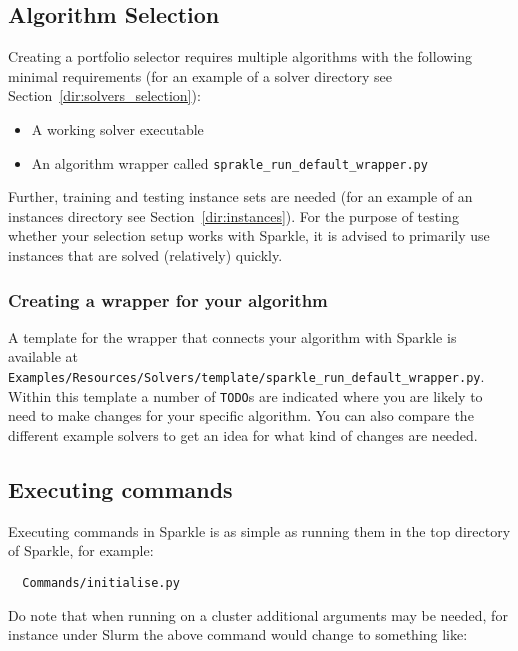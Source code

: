 \documentclass{article}
\begin{document}
\subsection{Algorithm Selection}
\label{quick:select_environment}

Creating a portfolio selector requires multiple algorithms with the following minimal requirements (for an example of a solver directory see Section~\ref{dir:solvers_selection}):

\begin{itemize}
  \item A working solver executable
  \item[\ref{quick:select_wrapper}] An algorithm wrapper called \texttt{sprakle\_run\_default\_wrapper.py}
\end{itemize}

Further, training and testing instance sets are needed (for an example of an instances directory see Section~\ref{dir:instances}). For the purpose of testing whether your selection setup works with Sparkle, it is advised to primarily use instances that are solved (relatively) quickly.

\subsubsection{Creating a wrapper for your algorithm}
\label{quick:select_wrapper}

A template for the wrapper that connects your algorithm with Sparkle is available at \texttt{Examples/Resources/Solvers/template/sparkle\_run\_default\_wrapper.py}. Within this template a number of \texttt{TODO}s are indicated where you are likely to need to make changes for your specific algorithm. You can also compare the different example solvers to get an idea for what kind of changes are needed.


\subsection{Executing commands}
\label{quick:execute_commands}

Executing commands in Sparkle is as simple as running them in the top directory of Sparkle, for example:

\begin{verbatim}
  Commands/initialise.py
\end{verbatim}

Do note that when running on a cluster additional arguments may be needed, for instance under Slurm the above command would change to something like:
\end{document}
